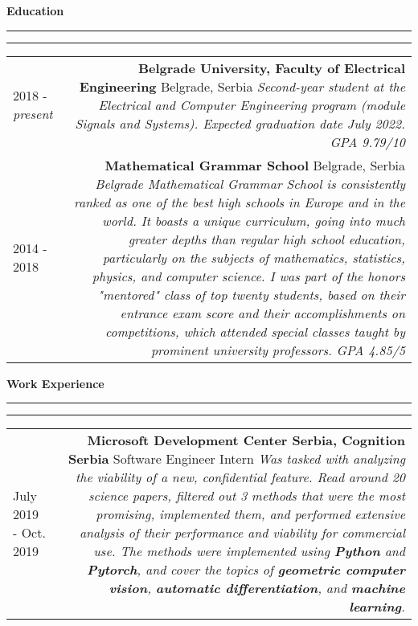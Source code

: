 \documentclass{article}
\newcommand{\mainitem}[3] {
    \textbf{#1}  \newline #2 \vskip5pt  \textit{#3} 
    \vspace{6pt}    %
}
\newenvironment{cvtable} {
	\hspace{-20pt} \begin{tabular}{L!{\color{line_color}\vrule width 1pt}D} %
} 
{\end{tabular}}
\renewcommand{\section}[1] {
    \vspace{15pt}   %
	{\color{main_color} \Large \textbf {#1}}
	{\color{line_color} \vskip-5pt \rule{\linewidth}{0.5mm}\hfill\vskip-11pt\rule{\linewidth}{0.2pt}}
	\vskip10pt  %
}
\begin{document}
    \section{Education}
    	\begin{cvtable}
    		2018 - \textit{present} & 
    			\mainitem
    				{Belgrade University, Faculty of Electrical Engineering}
    				{Belgrade, Serbia} 
    				{
    				Second-year student at the Electrical and Computer Engineering program (module Signals and Systems). Expected graduation date July 2022. GPA 9.79/10
    				} 
    		\\
    		2014 - 2018 & 
    			\mainitem
    				{Mathematical Grammar School}
    				{Belgrade, Serbia} 
    				{
                        Belgrade Mathematical Grammar School is consistently ranked as one of the best high schools in Europe and in the world. It boasts a unique curriculum, going into much greater depths than regular high school education, particularly on the subjects of mathematics, statistics, physics, and computer science.
                        I was part of the honors "mentored" class of top twenty students, based on their entrance exam score and their accomplishments on competitions, which attended special classes taught by prominent university professors. GPA 4.85/5
    				} 
    	\end{cvtable}
    
    
    \section{Work Experience}
    	\begin{cvtable}
    	    \hspace{5pt} July 2019 - Oct. 2019  & 
    			\mainitem
    			    {Microsoft Development Center Serbia, Cognition Serbia}
    				{Software Engineer Intern} {
    				    Was tasked with analyzing the viability of a new, confidential feature.
    					Read around 20 science papers, filtered out 3 methods that were the most promising, implemented them, and performed extensive analysis of their performance and viability for commercial use. The methods were implemented using \textbf{Python} and \textbf{Pytorch}, and cover the topics of \textbf{geometric computer vision}, \textbf{automatic differentiation}, and \textbf{machine learning}.
    				}
    	\end{cvtable}
    
\end{document}
